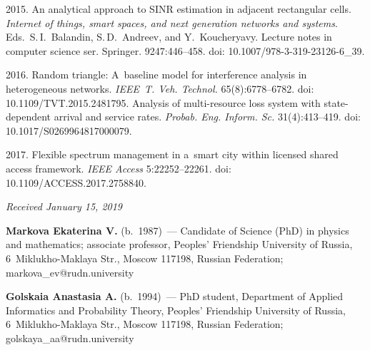 \begin{multicols}{2}
{{\begin{thebibliography}{99}
 2015. An analytical approach to SINR 
estimation in adjacent rectangular cells. 
\textit{Internet of 
things, smart spaces, and next generation networks and systems}.
Eds.\ S.\,I.~Balandin, S.\,D.~Andreev, and Y.~Koucheryavy.
Lecture notes in computer  science ser. Springer. 9247:446--458. doi: 
10.1007/978-3-319-23126-6\_39.

 2016. 
Random triangle: A~baseline model for interference analysis in heterogeneous networks. 
\textit{IEEE~T. Veh. Technol.} 65(8):6778--6782. doi: 
10.1109/TVT.2015.2481795.
Analysis of multi-resource loss system with state-dependent arrival and service rates. 
\textit{Probab. Eng. Inform. Sc.} 31(4):413--419. 
doi: 10.1017/S0269964817000079.

 2017. Flexible spectrum management in 
a~smart city within licensed shared 
access framework. \textit{IEEE Access} 5:22252--22261. doi: 10.1109/ACCESS.2017.2758840.
\end{thebibliography}

 }
 }

\end{multicols}

\vspace*{-6pt}

\hfill{\small\textit{Received January 15, 2019}}


\vspace*{-12pt}


\Contr

\noindent
\textbf{Markova Ekaterina V.} (b.\ 1987)~--- Candidate of Science (PhD) in physics and 
mathematics; associate professor, Peoples' Friendship University of Russia, 6~Miklukho-Maklaya 
Str., Moscow 117198, Russian Federation; \mbox{markova\_ev@rudn.university} 


\noindent
\textbf{Golskaia Anastasia A.} (b.\ 1994)~--- PhD student, Department of Applied Informatics 
and Probability Theory, Peoples' Friendship University of Russia, 6~Miklukho-Maklaya Str., 
Moscow 117198, Russian Federation; \mbox{golskaya\_aa@rudn.university}

